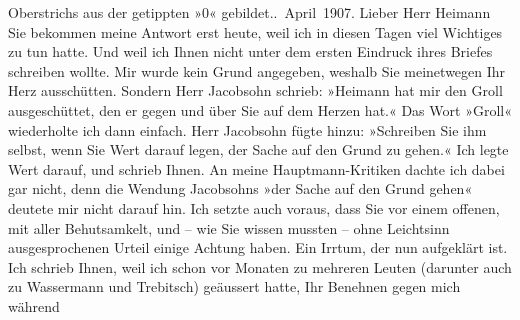 \begin{ledgroupsized}[t]{13cm}
{{{                        Oberstrichs aus der getippten »0«
                     gebildet.}}}\label{K_L03438-11h}. April 1907.\pend
           \pstart{}Lieber Herr Heimann\pend\pstart
           Sie bekommen meine Antwort erst heute, weil ich in diesen Tagen viel Wichtiges zu tun
               hatte. Und weil ich Ihnen nicht unter dem ersten Eindruck ihres Briefes schreiben
               wollte.\pend
           \pstart
           Mir wurde kein Grund angegeben, weshalb Sie meinetwegen Ihr Herz ausschütten. Sondern
               Herr Jacobsohn schrieb: »Heimann hat mir den Groll ausgeschüttet, den er gegen und
               über Sie auf dem Herzen hat.« Das Wort »Groll« wiederholte ich dann einfach.\pend
           \pstart
           Herr Jacobsohn fügte hinzu: »Schreiben Sie ihm
               selbst, wenn Sie Wert darauf legen, der Sache auf den Grund zu gehen.« Ich legte Wert
               darauf, und schrieb Ihnen. An meine Hauptmann-Kritiken
               dachte ich dabei gar nicht, denn die Wendung Jacobsohns »der Sache auf den Grund gehen« deutete mir nicht darauf hin. Ich
               setzte auch voraus, dass Sie vor einem offenen, mit aller Behutsamkelt, und – wie Sie
               wissen mussten – ohne Leichtsinn ausgesprochenen Urteil einige Achtung haben. Ein
               Irrtum, der nun aufgeklärt ist.\pend
           \pstart
           Ich schrieb Ihnen, weil ich schon vor Monaten zu mehreren Leuten (darunter auch zu
                  Wassermann und Trebitsch) geäussert hatte, Ihr Benehnen gegen mich während

\end{ledgroupsized}

